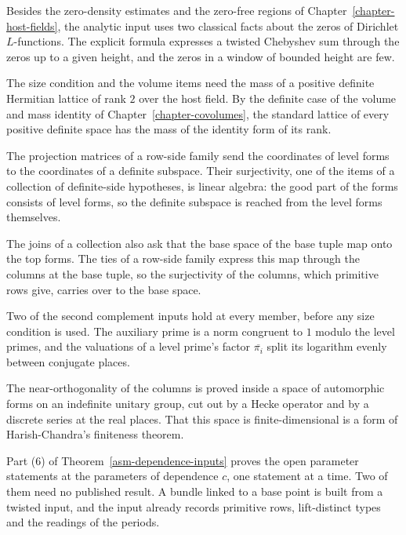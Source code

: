 Besides the zero-density estimates and the zero-free regions of
Chapter~\ref{chapter-host-fields}, the analytic input uses two classical facts
about the zeros of Dirichlet $L$-functions. The explicit formula expresses a
twisted Chebyshev sum through the zeros up to a given height, and the zeros in a
window of bounded height are few.

The size condition and the volume items need the mass of a positive definite
Hermitian lattice of rank $2$ over the host field. By the definite case of the
volume and mass identity of Chapter~\ref{chapter-covolumes}, the standard lattice
of every positive definite space has the mass of the identity form of its rank.

The projection matrices of a row-side family send the coordinates of level forms
to the coordinates of a definite subspace. Their surjectivity, one of the items of
a collection of definite-side hypotheses, is linear algebra: the good part of the
forms consists of level forms, so the definite subspace is reached from the level
forms themselves.

The joins of a collection also ask that the base space of the base tuple map onto
the top forms. The ties of a row-side family express this map through the
columns at the base tuple, so the surjectivity of the columns, which primitive
rows give, carries over to the base space.

Two of the second complement inputs hold at every member, before any size
condition is used. The auxiliary prime is a norm congruent to $1$ modulo the
level primes, and the valuations of a level prime's factor $\overline{\pi_i}$
split its logarithm evenly between conjugate places.

The near-orthogonality of the columns is proved inside a space of automorphic
forms on an indefinite unitary group, cut out by a Hecke operator and by a
discrete series at the real places. That this space is finite-dimensional is a
form of Harish-Chandra's finiteness theorem.

Part (6) of Theorem~\ref{asm-dependence-inputs} proves the open parameter
statements at the parameters of dependence $c$, one statement at a time. Two of
them need no published result. A bundle linked to a base point is built from a
twisted input, and the input already records primitive rows, lift-distinct
types and the readings of the periods.

